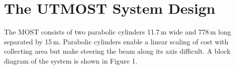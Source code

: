 \section{The UTMOST System Design}

The MOST consists of two parabolic cylinders 11.7\,m wide and 778\,m long separated by 15\,m. Parabolic cylinders enable a linear scaling of cost with collecting area but make steering the beam along its axis difficult. A block diagram of the system is shown in Figure 1. 

  